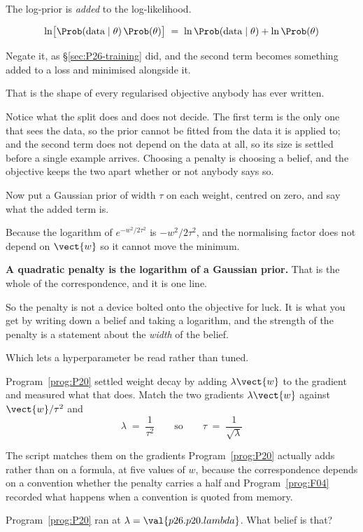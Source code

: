 \begin{fr}
\begin{ansblock}
The log-prior is \emph{added} to the log-likelihood.
\end{ansblock}

\[ \ln\bigl[\Prob(\text{data} \mid \theta)\,\Prob(\theta)\bigr]
   \;=\; \ln \Prob(\text{data} \mid \theta) + \ln \Prob(\theta) \]

Negate it, as \S\ref{sec:P26-training} did, and the second term becomes
something added to a loss and minimised alongside it.

That is the shape of every regularised objective anybody has ever written.

Notice what the split does and does not decide. The first term is the only one
that sees the data, so the prior cannot be fitted from the data it is applied
to; and the second term does not depend on the data at all, so its size is
settled before a single example arrives. Choosing a penalty is choosing a
belief, and the objective keeps the two apart whether or not anybody says so.

Now put a Gaussian prior of width $\tau$ on each weight, centred on zero, and
say what the added term is.
\dotline
\nextframe
\end{fr}

\begin{fr}

Because the logarithm of $e^{-w^{2}/2\tau^{2}}$ is $-w^{2}/2\tau^{2}$, and
the normalising factor does not depend on $\vect{w}$ so it cannot move the
minimum.

\textbf{A quadratic penalty is the logarithm of a Gaussian prior.} That is
the whole of the correspondence, and it is one line.

So the penalty is not a device bolted onto the objective for luck. It is what
you get by writing down a belief and taking a logarithm, and the strength of
the penalty is a statement about the \emph{width} of the belief.
\end{fr}

\begin{fr}
Which lets a hyperparameter be read rather than tuned.

Program~\ref{prog:P20} settled weight decay by adding $\lambda\vect{w}$ to
the gradient and measured what that does. Match the two gradients \dash{}
$\lambda\vect{w}$ against $\vect{w}/\tau^{2}$ \dash{} and
\[ \lambda \;=\; \frac{1}{\tau^{2}}
   \qquad\text{so}\qquad \tau \;=\; \frac{1}{\sqrt{\lambda}} \]

The script matches them on the gradients Program~\ref{prog:P20} actually adds
rather than on a formula, at five values of $w$, because the correspondence
depends on a convention \dash{} whether the penalty carries a half \dash{}
and Program~\ref{prog:F04} recorded what happens when a convention is quoted
from memory.

Program~\ref{prog:P20} ran at $\lambda = \val{p26.p20.lambda}$. What belief
is that?
\dotline
\nextframe
\end{fr}

